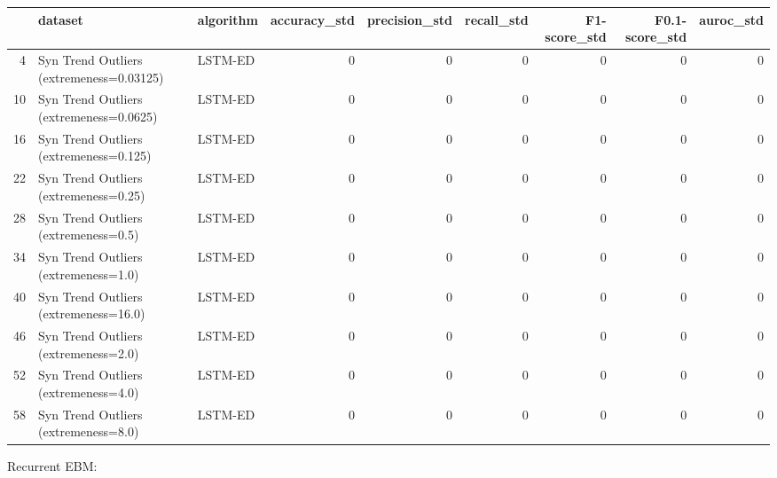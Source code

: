 \begin{tabular}{rllrrrrrr}
\hline
    & dataset                                  & algorithm   &   accuracy\_std &   precision\_std &   recall\_std &   F1-score\_std &   F0.1-score\_std &   auroc\_std \\
\hline
  4 & Syn Trend Outliers (extremeness=0.03125) & LSTM-ED     &              0 &               0 &            0 &              0 &                0 &           0 \\
 10 & Syn Trend Outliers (extremeness=0.0625)  & LSTM-ED     &              0 &               0 &            0 &              0 &                0 &           0 \\
 16 & Syn Trend Outliers (extremeness=0.125)   & LSTM-ED     &              0 &               0 &            0 &              0 &                0 &           0 \\
 22 & Syn Trend Outliers (extremeness=0.25)    & LSTM-ED     &              0 &               0 &            0 &              0 &                0 &           0 \\
 28 & Syn Trend Outliers (extremeness=0.5)     & LSTM-ED     &              0 &               0 &            0 &              0 &                0 &           0 \\
 34 & Syn Trend Outliers (extremeness=1.0)     & LSTM-ED     &              0 &               0 &            0 &              0 &                0 &           0 \\
 40 & Syn Trend Outliers (extremeness=16.0)    & LSTM-ED     &              0 &               0 &            0 &              0 &                0 &           0 \\
 46 & Syn Trend Outliers (extremeness=2.0)     & LSTM-ED     &              0 &               0 &            0 &              0 &                0 &           0 \\
 52 & Syn Trend Outliers (extremeness=4.0)     & LSTM-ED     &              0 &               0 &            0 &              0 &                0 &           0 \\
 58 & Syn Trend Outliers (extremeness=8.0)     & LSTM-ED     &              0 &               0 &            0 &              0 &                0 &           0 \\
\hline
\end{tabular}

Recurrent EBM:

